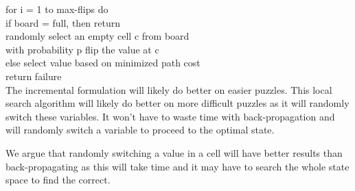 for i = 1 to max-flips do \\
	if board = full, then return  \\
	randomly select an empty cell c from board \\
	with probability p flip the value at c \\
	else select value based on minimized path cost \\
return failure \\

The incremental formulation will likely do better on easier puzzles. This local search algorithm will likely do better on more difficult puzzles as it will randomly switch these variables. It won't have to waste time with back-propagation and will randomly switch a variable to proceed to the optimal state.

We argue that randomly switching a value in a cell will have better results than back-propagating as this will take time and it may have to search the whole state space to find the correct.